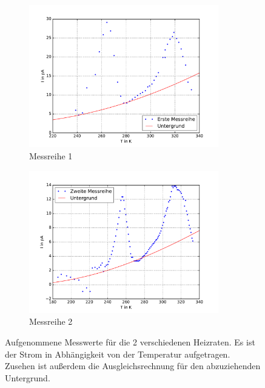 \begin{figure}[H]
  \centering
  \begin{subfigure}{0.48\textwidth}
    \includegraphics[height=6.2cm]{plots/mituntergrund.pdf}
    \caption{Messreihe 1}
    \label{fig:mess1}
  \end{subfigure}
  \begin{subfigure}{0.48\textwidth}
    \includegraphics[height=6.2cm]{plots/mituntergrund2.pdf}
    \caption{Messreihe 2}
    \label{fig:mess2}
  \end{subfigure}
  \caption{Aufgenommene Messwerte für die 2 verschiedenen Heizraten. Es ist der  Strom in Abhängigkeit von der Temperatur aufgetragen. Zusehen ist außerdem die Ausgleichsrechnung  für den abzuziehenden Untergrund.}
  \label{fig:mitunter}
\end{figure}
